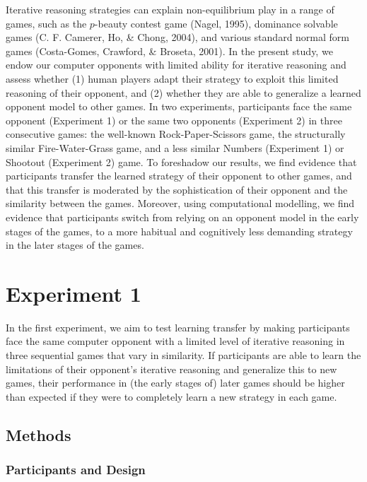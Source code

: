 \documentclass[
  english,
  man,floatsintext]{apa6}
\begin{document}
Iterative reasoning strategies can explain non-equilibrium play in a range of games, such as the \(p\)-beauty contest game (Nagel, 1995), dominance solvable games (C. F. Camerer, Ho, \& Chong, 2004), and various standard normal form games (Costa-Gomes, Crawford, \& Broseta, 2001). In the present study, we endow our computer opponents with limited ability for iterative reasoning and assess whether (1) human players adapt their strategy to exploit this limited reasoning of their opponent, and (2) whether they are able to generalize a learned opponent model to other games. In two experiments, participants face the same opponent (Experiment 1) or the same two opponents (Experiment 2) in three consecutive games: the well-known Rock-Paper-Scissors game, the structurally similar Fire-Water-Grass game, and a less similar Numbers (Experiment 1) or Shootout (Experiment 2) game. To foreshadow our results, we find evidence that participants transfer the learned strategy of their opponent to other games, and that this transfer is moderated by the sophistication of their opponent and the similarity between the games. Moreover, using computational modelling, we find evidence that participants switch from relying on an opponent model in the early stages of the games, to a more habitual and cognitively less demanding strategy in the later stages of the games.

\hypertarget{experiment-1}{%
\section{Experiment 1}\label{experiment-1}}

In the first experiment, we aim to test learning transfer by making participants face the same computer opponent with a limited level of iterative reasoning in three sequential games that vary in similarity. If participants are able to learn the limitations of their opponent's iterative reasoning and generalize this to new games, their performance in (the early stages of) later games should be higher than expected if they were to completely learn a new strategy in each game.

\hypertarget{methods}{%
\subsection{Methods}\label{methods}}

\hypertarget{participants-and-design}{%
\subsubsection{Participants and Design}\label{participants-and-design}}
\end{document}
